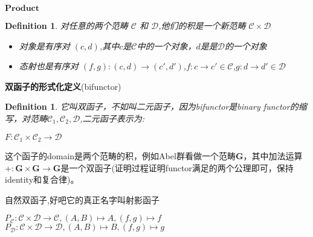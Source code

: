 \documentclass[UTF8,11pt,a4paper]{ctexart}
\newtheorem{definition}[theorem]{Definition}
\begin{document}
\begin{flushleft}
$\textbf{Product}$ \\
\begin{definition}
对任意的两个范畴 $\mathcal{C}$ 和 $\mathcal{D}$,他们的积是一个新范畴 $\mathcal{C} \times \mathcal{D}$\\
\begin{itemize}
	\item 对象是有序对 $\left( c,d \right)$,其中$c$是$\mathcal{C}$中的一个对象，$d$是是$\mathcal{D}$的一个对象 
	\item 态射也是有序对 $\left(f,g \right) \colon \left(c,d\right) \rightarrow \left(c',d'\right)$,$f\colon c \rightarrow c' \in \mathcal{C}$,$g \colon d \rightarrow d' \in \mathcal{D}$
\end{itemize}
\end{definition}
\end{flushleft}


\begin{flushleft}
\textbf{双函子的形式化定义}(bifunctor) \\ 
\begin{definition}
它叫双函子，不如叫二元函子，因为bifunctor是binary functor的缩写，对范畴$\mathcal{C}_1,\mathcal{C}_2,\mathcal{D}$,二元函子表示为:\\

\begin{center}
$F \colon \mathcal{C}_1 \times \mathcal{C}_2 \rightarrow \mathcal{D}$
\end{center}
\end{definition}

这个函子的domain是两个范畴的积，例如Abel群看做一个范畴$\mathbf{G}$，其中加法运算 $+ \colon \mathbf{G} \times \mathbf{G} \rightarrow \mathbf{G}$是一个双函子(证明过程证明functor满足的两个公理即可，保持identity和复合律)。 

\end{flushleft}


\begin{flushleft}
$\textbf{自然双函子}$,好吧它的真正名字叫$\textbf{射影函子}$ \\
\begin{center}
$P_{\mathcal{C}} \colon \mathcal{C} \times \mathcal{D} \rightarrow \mathcal{C},\left( A,B \right)\mapsto A,\left( f,g \right)\mapsto f$ \\ \vbox{}
$P_{\mathcal{D}} \colon \mathcal{C} \times \mathcal{D} \rightarrow \mathcal{D},\left( A,B \right)\mapsto B,\left( f,g \right)\mapsto g$ \\
\end{center} 
\end{flushleft}
\end{document}
